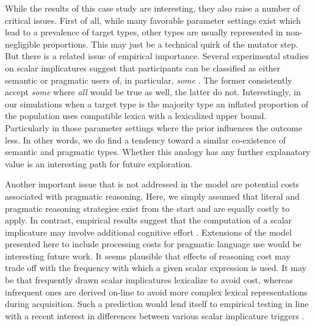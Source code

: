 \documentclass[a4paper, 11pt]{article}
\theoremstyle{Satz}
\begin{document}
While the results of this case study are interesting, they also raise a number of critical
issues. First of all, while many favorable parameter settings exist which lead to a prevalence
of target types, other types are usually represented in non-negligible proportions. This may
just be a technical quirk of the mutator step. But there is a related issue of empirical
importance. Several experimental studies on scalar implicatures suggest that participants can
be classified as either semantic or pragmatic users of, in particular, \emph{some}
\citep[e.g.,][]{BottNoveck2004:Some-Utterances,NieuwlandDitman2010:On-the-incremen,DegenTanenhaus2012:Processing-Scal}. The
former consistently accept \emph{some} where \emph{all} would be true as well, the latter do
not. Interestingly, in our simulations when a target type is the majority type an inflated
proportion of the population uses compatible lexica with a lexicalized upper
bound. Particularly in those parameter settings where the prior influences the outcome less. In
other words, we do find a tendency toward a similar co-existence of semantic and pragmatic
types. Whether this analogy has any further explanatory value is an interesting path for future
exploration.

Another important issue that is not addressed in the model are potential costs associated with
pragmatic reasoning. Here, we simply assumed that literal and pragmatic reasoning strategies
exist from the start and are equally costly to apply. In contrast, empirical results suggest
that the computation of a scalar implicature may involve additional cognitive effort
\citep[e.g.,][]{BrehenyKatsos2006:Are-Generalised,deNeys+schaeken:2007,huang+snedeker:2009,Jr.Bailey2013:Possibly-all-of}. Extensions
of the model presented here to include processing costs for pragmatic language use would be
interesting future work. It seems plausible that effects of reasoning cost may trade off with
the frequency with which a given scalar expression is used. It may be that frequently drawn
scalar implicatures lexicalize to avoid cost, whereas infrequent ones are derived on-line to
avoid more complex lexical representations during acquisition. Such a prediction would lend itself to
empirical testing in line with a recent interest in differences between various scalar
implicature triggers \citep{Tielvan-TielMiltenburgvan-Miltenburg2014:Scalar-Diversit}. 
\end{document}
